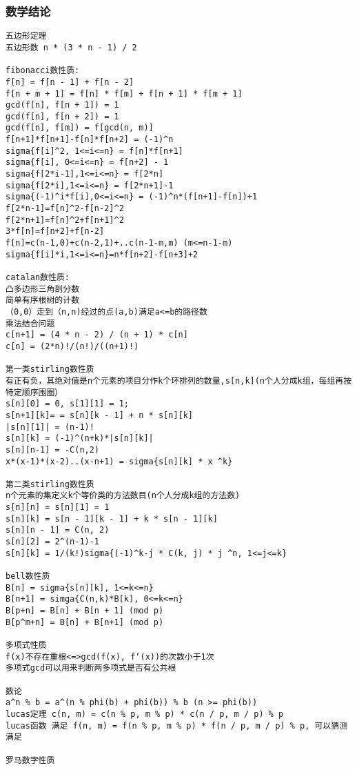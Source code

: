 \subsubsection{数学结论}
\begin{verbatim}
五边形定理
五边形数 n * (3 * n - 1) / 2

fibonacci数性质:
f[n] = f[n - 1] + f[n - 2]
f[n + m + 1] = f[n] * f[m] + f[n + 1] * f[m + 1]
gcd(f[n], f[n + 1]) = 1
gcd(f[n], f[n + 2]) = 1
gcd(f[n], f[m]) = f[gcd(n, m)]
f[n+1]*f[n+1]-f[n]*f[n+2] = (-1)^n
sigma{f[i]^2, 1<=i<=n} = f[n]*f[n+1]
sigma{f[i], 0<=i<=n} = f[n+2] - 1
sigma{f[2*i-1],1<=i<=n} = f[2*n]
sigma{f[2*i],1<=i<=n} = f[2*n+1]-1
sigma{(-1)^i*f[i],0<=i<=n} = (-1)^n*(f[n+1]-f[n])+1
f[2*n-1]=f[n]^2-f[n-2]^2
f[2*n+1]=f[n]^2+f[n+1]^2
3*f[n]=f[n+2]+f[n-2]
f[n]=c(n-1,0)+c(n-2,1)+..c(n-1-m,m) (m<=n-1-m)
sigma{f[i]*i,1<=i<=n}=n*f[n+2]-f[n+3]+2

catalan数性质:
凸多边形三角剖分数
简单有序根树的计数
（0,0）走到（n,n)经过的点(a,b)满足a<=b的路径数
乘法结合问题
c[n+1] = (4 * n - 2) / (n + 1) * c[n]
c[n] = (2*n)!/(n!)/((n+1)!)

第一类stirling数性质
有正有负，其绝对值是n个元素的项目分作k个环排列的数量,s[n,k](n个人分成k组，每组再按特定顺序围圈）
s[n][0] = 0, s[1][1] = 1;
s[n+1][k]= = s[n][k - 1] + n * s[n][k]
|s[n][1]| = (n-1)!
s[n][k] = (-1)^(n+k)*|s[n][k]|
s[n][n-1] = -C(n,2)
x*(x-1)*(x-2)..(x-n+1) = sigma{s[n][k] * x ^k}

第二类stirling数性质
n个元素的集定义k个等价类的方法数目(n个人分成k组的方法数)
s[n][n] = s[n][1] = 1
s[n][k] = s[n - 1][k - 1] + k * s[n - 1][k]
s[n][n - 1] = C(n, 2)
s[n][2] = 2^(n-1)-1
s[n][k] = 1/(k!)sigma{(-1)^k-j * C(k, j) * j ^n, 1<=j<=k}

bell数性质
B[n] = sigma{s[n][k], 1<=k<=n}
B[n+1] = simga{C(n,k)*B[k], 0<=k<=n}
B[p+n] = B[n] + B[n + 1] (mod p)
B[p^m+n] = B[n] + B[n+1] (mod p)

多项式性质
f(x)不存在重根<=>gcd(f(x), f‘(x))的次数小于1次
多项式gcd可以用来判断两多项式是否有公共根

数论
a^n % b = a^(n % phi(b) + phi(b)) % b (n >= phi(b))
lucas定理 c(n, m) = c(n % p, m % p) * c(n / p, m / p) % p
lucas函数 满足 f(n, m) = f(n % p, m % p) * f(n / p, m / p) % p, 可以猜测满足

罗马数字性质
\end{verbatim}
